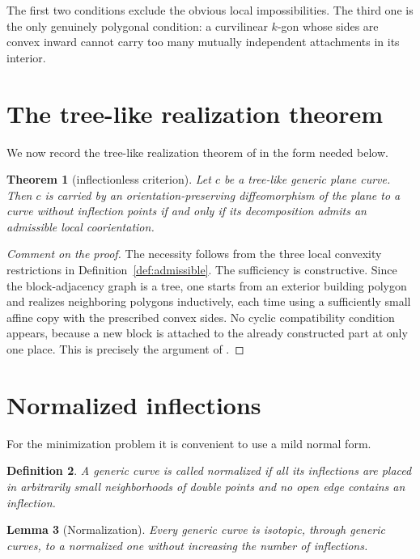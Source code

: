 \documentclass[11pt]{article}
\newtheorem{theorem}{Theorem}[section]
\newtheorem{definition}[theorem]{Definition}
\newtheorem{lemma}[theorem]{Lemma}
\begin{document}
The first two conditions exclude the obvious local impossibilities.  The third one is the only genuinely polygonal condition: a curvilinear $k$-gon whose sides are convex inward cannot carry too many mutually independent attachments in its interior.

\section{The tree-like realization theorem}

We now record the tree-like realization theorem of \cite{ShapiroTree} in the form needed below.

\begin{theorem}[inflectionless criterion]\label{thm:shapiro}
Let $c$ be a tree-like generic plane curve.  Then $c$ is carried by an orientation-preserving diffeomorphism of the plane to a curve without inflection points if and only if its decomposition admits an admissible local coorientation.
\end{theorem}

\begin{proof}[Comment on the proof]
The necessity follows from the three local convexity restrictions in Definition~\ref{def:admissible}.  The sufficiency is constructive.  Since the block-adjacency graph is a tree, one starts from an exterior building polygon and realizes neighboring polygons inductively, each time using a sufficiently small affine copy with the prescribed convex sides.  No cyclic compatibility condition appears, because a new block is attached to the already constructed part at only one place.  This is precisely the argument of \cite{ShapiroTree}.
\end{proof}


\section{Normalized inflections}

For the minimization problem it is convenient to use a mild normal form.

\begin{definition}
A generic curve is called \emph{normalized} if all its inflections are placed in arbitrarily small neighborhoods of double points and no open edge contains an inflection.
\end{definition}

\begin{lemma}[Normalization]\label{lem:normalization}
Every generic curve is isotopic, through generic curves, to a normalized one without increasing the number of inflections.
\end{lemma}
\end{document}
